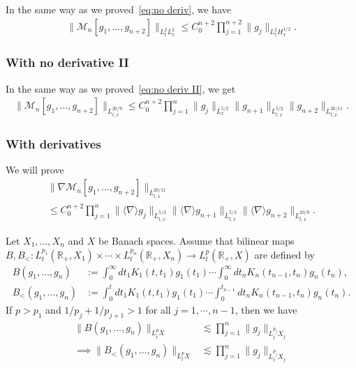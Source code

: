\documentclass[10pt,a4paper]{amsart}
\newcommand{\BR}{\mathbb{R}}
\newcommand{\CM}{\mathcal{M}}
\newcommand{\I}{\infty}
\newcommand{\sd}{\langle \nabla \rangle}
\newcommand{\tx}{{t,x}}
\newcommand{\na}{\nabla}
\newcommand{\ls}{\lesssim}
\begin{document}
In the same way as we proved~\eqref{eq:no deriv}, we have
\begin{align}\label{eq:with no deriv b I}
\|\CM_n[g_1,\dots,g_{n+2}]\|_{L^2_t L^2_x} \le C_0^{n+2} \prod_{j=1}^{n+2} \|g_j\|_{L^2_t H^{1/2}_x}.
\end{align}

\subsubsection{With no derivative II} 

In the same way as we proved~\eqref{eq:no deriv II}, we get
\begin{align}\label{eq:with no deriv b II}
\|\CM_n[g_1,\dots,g_{n+2}]\|_{L^{20/9}_\tx}
\le C_0^{n+2} \prod_{j=1}^{n}
\|g_j\|_{L^{5/2}_x}
\|g_{n+1}\|_{L^{5/2}_\tx}
\|g_{n+2}\|_{L^{20/11}_\tx}.
\end{align}


\subsubsection{With derivatives} 

We will prove
\begin{multline}\label{eq:with deriv b}
\|\na \CM_n[g_1,\dots,g_{n+2}]\|_{L^{20/11}_\tx}
\\
\le C_0^{n+2} \prod_{j=1}^{n}
\|\sd g_j\|_{L^{5/3}_\tx}
\|\sd g_{n+1}\|_{L^{5/3}_\tx}
\|\sd g_{n+2}\|_{L^{20/9}_\tx}.
\end{multline}

\begin{lemm}\label{lem:MCK}
Let $X_1, \dots, X_n$ and $X$ be Banach spaces. Assume that bilinear maps $B,B_<:L^{p_1}_t(\BR_+,X_1) \times \cdots \times L^{p_n}_t(\BR_+,X_n) \to L^p_t(\BR_+,X)$ are defined by
\begin{align}
B(g_1,\dots, g_n) &:= \int_0^\I dt_1 K_1(t,t_1)g_1(t_1) \cdots \int_0^\I dt_n K_n(t_{n-1},t_n)g_n(t_n), \\
B_<(g_1, \dots, g_n) &:= \int_0^t dt_1 K_1(t,t_1)g_1(t_1) \cdots \int_0^{t_{n-1}} dt_n K_n(t_{n-1},t_n)g_n(t_n).
\end{align}
If $p>p_1$ and $1/p_j+1/p_{j+1} > 1$ for all $j=1,\cdots,n-1$, then we have
\begin{equation}
\begin{split}
\|B(g_1,\dots,g_n)\|_{L^p_t X}
&\ls \prod_{j=1}^n \|g_j\|_{L^{p_j}_t X_j}\\
\implies
\|B_<(g_1,\dots,g_n)\|_{L^p_t X}
&\ls \prod_{j=1}^n \|g_j\|_{L^{p_j}_t X_j}
\end{split}
\end{equation}
\end{lemm}
\end{document}
